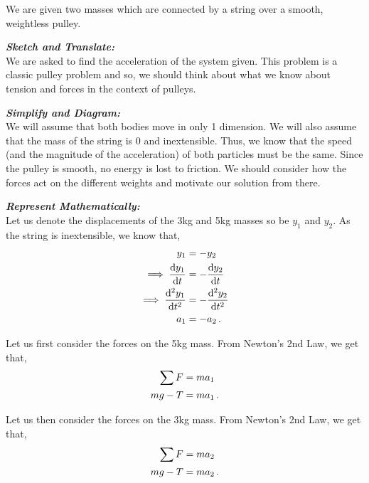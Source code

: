 \begin{subquestions}

\subquestion
We are given two masses which are connected by a string over a smooth, weightless pulley.

\textbf{\textit{Sketch and Translate:}} \\
We are asked to find the acceleration of the system given. This problem is a classic pulley problem and so, we should think about what we know about tension and forces in the context of pulleys.




\textbf{\textit{Simplify and Diagram:}} \\
We will assume that both bodies move in only 1 dimension. We will also assume that the mass of the string is 0 and inextensible. Thus, we know that the speed (and the magnitude of the acceleration) of both particles must be the same. Since the pulley is smooth, no energy is lost to friction. We should consider how the forces act on the different weights and motivate our solution from there.




\textbf{\textit{Represent Mathematically:}} \\ 
Let us denote the displacements of the 3kg and 5kg masses so be $y_1$ and $y_2$. As the string is inextensible, we know that,
\begin{align}
	y_1 & = -y_2 \nonumber \\
	\implies \frac{\mathrm{d}y_1}{\mathrm{d}t} & = -\frac{\mathrm{d}y_2}{\mathrm{d}t} \nonumber \\
	\implies \frac{\mathrm{d}^2y_1}{\mathrm{d}t^2} & = -\frac{\mathrm{d}^2y_2}{\mathrm{d}t^2} \nonumber \\
	a_1 & = -a_2 \,.
\end{align}



Let us first consider the forces on the 5kg mass. From Newton's 2nd Law, we get that,
\begin{align}
	\sum F & = ma_1 \nonumber \\
	mg - T & = ma_1 \,.
\end{align}

Let us then consider the forces on the 3kg mass. From Newton's 2nd Law, we get that,
\begin{align}
	\sum F & = ma_2 \nonumber \\
	 mg-T & = ma_2 \,.
\end{align}





\end{subquestions}
